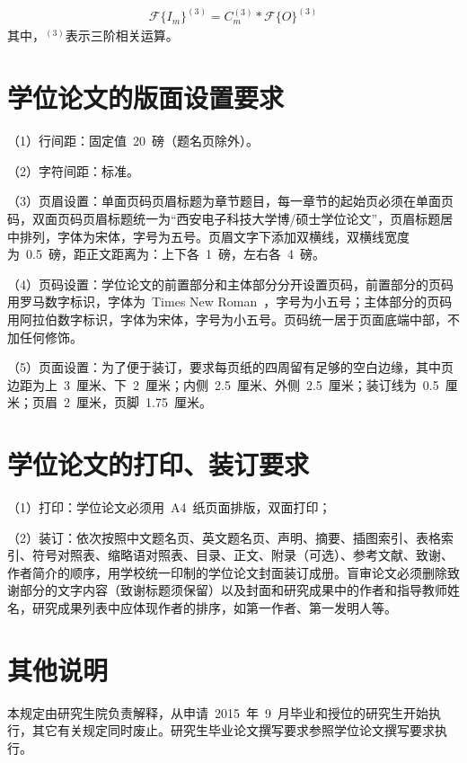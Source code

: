 \begin{equation}
\begin{aligned}
    \mathcal{F} \{ I_m \}^{(3)} = C_m^{(3)}*\mathcal{F}\{ O \}^{(3)}
\end{aligned}
\label{eq:4.8}
\end{equation}其中，$^{(3)}$表示三阶相关运算。

\section{学位论文的版面设置要求}

（1）行间距：固定值~20~磅（题名页除外）。

（2）字符间距：标准。

（3）页眉设置：单面页码页眉标题为章节题目，每一章节的起始页必须在单面页码，双面页码页眉标题统一为“西安电子科技大学博/硕士学位论文”，页眉标题居中排列，字体为宋体，字号为五号。页眉文字下添加双横线，双横线宽度为~0.5~磅，距正文距离为：上下各~1~磅，左右各~4~磅。

（4）页码设置：学位论文的前置部分和主体部分分开设置页码，前置部分的页码用罗马数字标识，字体为~Times New Roman~，字号为小五号；主体部分的页码用阿拉伯数字标识，字体为宋体，字号为小五号。页码统一居于页面底端中部，不加任何修饰。

（5）页面设置：为了便于装订，要求每页纸的四周留有足够的空白边缘，其中页边距为上~3~厘米、下~2~厘米；内侧~2.5~厘米、外侧~2.5~厘米；装订线为~0.5~厘米；页眉~2~厘米，页脚~1.75~厘米。

\section{学位论文的打印、装订要求}

（1）打印：学位论文必须用~A4~纸页面排版，双面打印；

（2）装订：依次按照中文题名页、英文题名页、声明、摘要、插图索引、表格索引、符号对照表、缩略语对照表、目录、正文、附录（可选）、参考文献、致谢、作者简介的顺序，用学校统一印制的学位论文封面装订成册。盲审论文必须删除致谢部分的文字内容（致谢标题须保留）以及封面和研究成果中的作者和指导教师姓名，研究成果列表中应体现作者的排序，如第一作者、第一发明人等。

\section{其他说明}

本规定由研究生院负责解释，从申请~2015~年~9~月毕业和授位的研究生开始执行，其它有关规定同时废止。研究生毕业论文撰写要求参照学位论文撰写要求执行。

